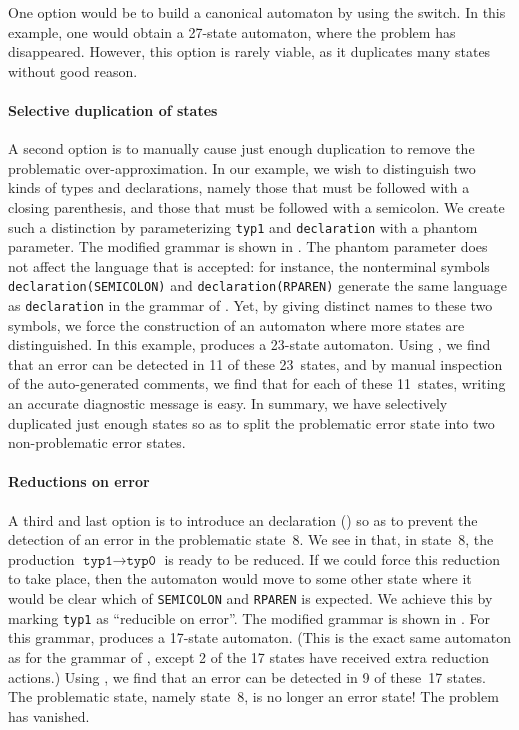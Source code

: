 \documentclass[onecolumn,11pt,nocopyrightspace,preprint]{sigplanconf}
\begin{document}
One option would be to build a canonical automaton by using the
\ocanonical switch. In this example, one would
obtain a 27-state automaton, where the problem has disappeared. However, this
option is rarely viable, as it duplicates many states without good reason.

\paragraph{Selective duplication of states}

A second option is to manually cause just enough duplication to remove the
problematic over-approximation. In our example, we wish to distinguish two kinds
of types and declarations, namely those that must be followed with a closing
parenthesis, and those that must be followed with a semicolon. We create
such a distinction by parameterizing \verb+typ1+ and \verb+declaration+ with a
phantom parameter. The modified grammar is shown
in . The phantom parameter does not affect the
language that is accepted: for instance, the nonterminal
symbols \texttt{declaration(SEMICOLON)} and
\texttt{declaration(RPAREN)} generate the same language as \texttt{declaration}
in the grammar of . Yet, by giving
distinct names to these two symbols, we force the construction of an
automaton where more states are distinguished. In this example, \menhir produces
a 23-state automaton. Using \olisterrors, we find that an error can be
detected in 11 of these 23~states, and by manual inspection of the
auto-generated comments, we find that for each of these 11~states, writing an
accurate diagnostic message is easy. In summary, we have selectively duplicated
just enough states so as to split the problematic error state into two
non-problematic error states.


\paragraph{Reductions on error}

A third and last option is to introduce an \donerrorreduce declaration
() so as to prevent the detection of an error in the
problematic state~8. We see in  that, in
state~8, the production $\texttt{typ1} \rightarrow \texttt{typ0}$ is ready to
be reduced. If we could force this reduction to take place, then the automaton
would move to some other state where it would be clear which
of \verb+SEMICOLON+ and \verb+RPAREN+ is expected. We
achieve this by marking \verb+typ1+ as ``reducible on error''.
The modified grammar is shown
in .
For this grammar, \menhir produces a 17-state automaton.
(This is the exact same automaton as for the grammar of ,
except 2 of the 17 states have received extra reduction actions.)
Using \olisterrors, we find that an error can be detected in 9 of these~17 states.
The problematic state, namely state~8, is no longer an error state!
The problem has vanished.
\end{document}
